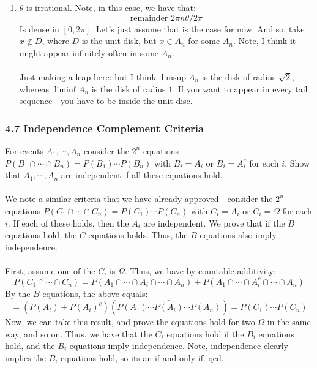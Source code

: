 \documentclass[12pt,a4paper]{article}
\newcommand{\1}[1]{\mathbbm{1}\left\{ #1 \right\}}
\begin{document}
\begin{enumerate}
	\item $\theta$ is irrational. Note, in this case, we have that:
	$$
		\text{remainder } 2\pi n \theta / 2\pi
	$$
	Is dense in $[0,2\pi]$. Let's just assume that is the case for now. And so, take $x \not\in D$, where $D$ is the unit disk, but $x \in A_n$ for some $A_n$. Note, I think it might appear infinitely often in some $A_n$.
	\\\\
	Just making a leap here: but I think $\limsup A_n$ is the disk of radius $\sqrt{2}$, whereas $\liminf A_n$ is the disk of radius $1$. If you want to appear in every tail sequence - you have to be inside the unit disc.
		
\end{enumerate}

\subsubsection{4.7 Independence Complement Criteria} For events $A_1, \cdots, A_n$ consider the $2^n$ equations $P(B_1 \cap \cdots \cap B_n) = P(B_1) \cdots P(B_n)$ with $B_i = A_i$ or $B_i = A_i^c$ for each $i$. Show that $A_1, \cdots, A_n$ are independent if all these equations hold.
\\\\
We note a similar criteria that we have already approved - consider the $2^n$ equations $P(C_1 \cap \cdots \cap C_n) = P(C_1) \cdots P(C_n)$ with $C_i = A_i$ or $C_i = \Omega$ for each $i$. If each of these holds, then the $A_i$ are independent. We prove that if the $B$ equations hold, the $C$ equations holds. Thus, the $B$ equations also imply independence.
\\\\
First, assume one of the $C_i$ is $\Omega$. Thus, we have by countable additivity:
$$
	P(C_1 \cap \cdots \cap C_n) = 
	P(A_1 \cap \cdots \cap A_i \cap \cdots \cap A_n) + 
	P(A_1 \cap \cdots \cap A_i^c \cap \cdots \cap A_n)
$$
By the $B$ equations, the above equals:
$$
	= (P(A_i) + P(A_i)^c)(P(A_1) \cdots \widehat{P(A_i)} \cdots P(A_n)) =
	P(C_1) \cdots P(C_n)
$$
Now, we can take this result, and prove the equations hold for two $\Omega$ in the same way, and so on. Thus, we have that the $C_i$ equations hold if the $B_i$ equations hold, and the $B_i$ equations imply independence. Note, independence clearly implies the $B_i$ equations hold, so its an if and only if. qed.
\end{document}
